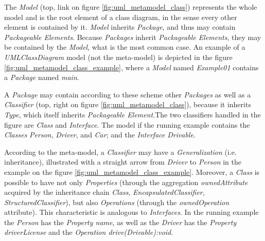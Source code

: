 \documentclass[tuberlin,cic,tc,english,noabntcite]{iiufrgs}
\begin{document}
The \emph{Model} (top, link on figure \ref{fig:uml_metamodel_class}) represents the whole model and is the root element of a class diagram, in the sense every other element is contained by it. \emph{Model} inherits \emph{Package}, and thus may contain \emph{Packageable Elements}. Because \emph{Packages} inherit \emph{Packageable Elements}, they may be contained by the \emph{Model}, what is the most common case. An example of a \emph{UMLClassDiagram} model (not the meta-model) is depicted in the figure \ref{fig:uml_metamodel_class_example}, where a \emph{Model} named \emph{Example01} contains a \emph{Package} named \emph{main}.

A \emph{Package} may contain according to these scheme other \emph{Packages} as well as a \emph{Classifier} (top, right on  figure \ref{fig:uml_metamodel_class}), because it inherits \emph{Type}, which itself inherits \emph{Packageable Element}.The two classifiers handled in the figure are \emph{Class} and \emph{Interface}. The model if the running example contains the \emph{Classes} \emph{Person}, \emph{Driver}, and \emph{Car}; and the \emph{Interface} \emph{Drivable}.

According to the meta-model, a \emph{Classifier} may have a \emph{Generalization} (i.e. inheritance), illustrated with a straight arrow from \emph{Driver} to \emph{Person} in the example on the figure \ref{fig:uml_metamodel_class_example}. Moreover, a \emph{Class} is possible to have not only \emph{Properties} (through the aggregation \emph{ownedAttribute} acquired by the inheritance chain \emph{Class}, \emph{EncapsulatedClassifier}, \emph{StructuredClassifier}), but also \emph{Operations} (through the \emph{ownedOperation} attribute). This characteristic is analogous to \emph{Interfaces}. In the running example the \emph{Person} has the \emph{Property name}, as well as the \emph{Driver} has the \emph{Property driverLicense} and the \emph{Operation drive(Drivable):void}. 

\end{document}
